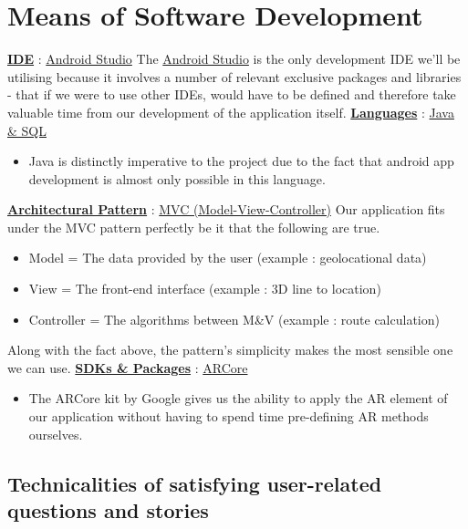
\section*{Means of Software Development}
    
    \underline{\textbf{IDE}} : \underline{Android Studio}
    \newline
    \newline
    The \underline{Android Studio} is the only development IDE we'll be utilising because it involves a number of relevant exclusive packages and libraries - that if we were to use other IDEs, would have to be defined and therefore take valuable time from our development of the application itself.
    \newline
    \newline
    \underline{\textbf{Languages}} : \underline{Java \& SQL}
    \begin{itemize}
        \item Java is distinctly imperative to the project due to the fact that android app development is almost only possible in this language.
    \end{itemize}
    \underline{\textbf{Architectural Pattern}} : \underline{MVC (Model-View-Controller)}
    \newline
    \newline
    Our application fits under the MVC pattern perfectly be it that the following are true.
    \begin{itemize}
        \item Model = The data provided by the user (example : geolocational data)
        \item View = The front-end interface (example : 3D line to location)
        \item Controller = The algorithms between M\&V (example : route calculation)
    \end{itemize}
    Along with the fact above, the pattern's simplicity makes the most sensible one we can use.
    \newline
    \newline
    \underline{\textbf{SDKs \& Packages}} : \underline{ARCore}
    \begin{itemize}
        \item The ARCore kit by Google gives us the ability to apply the AR element of our application without having to spend time pre-defining AR methods ourselves.
    \end{itemize}
    \newpage
\begin{center}
    \section*{Technicalities of satisfying user-related questions and stories}
\end{center}